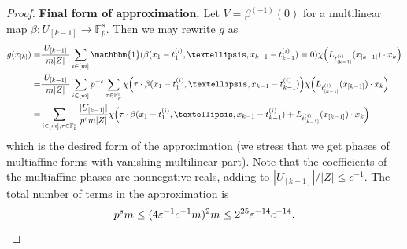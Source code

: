 \documentclass[10pt,a4paper]{amsart}
\newcommand\id{\mathbbm{1}}
\begin{document}
\begin{proof}
    \noindent\textbf{Final form of approximation.} Let $V = \beta^{(-1)}(0)$ for a multilinear map $\beta: U_{[k-1]} \to \mathbb{F}_p^s$. Then we may rewrite $g$ as 
    \begin{align*}g(x_{[k]}) = &\frac{|U_{[k-1]}|}{m |Z|} \sum_{i \in [m]} \id(\beta(x_1 - t^{(i)}_1,\dots,x_{k-1} - t^{(i)}_{k-1}) = 0) \chi\Big(L_{t^{(i)}_{[k-1]}}(x_{[k-1]}) \cdot x_k\Big)\\
    = & \frac{|U_{[k-1]}|}{m |Z|} \sum_{i \in [m]} p^{-s}\sum_{\tau \in \mathbb{F}_p^s} \chi\Big(\tau\cdot \beta(x_1 - t^{(i)}_1,\dots,x_{k-1} - t^{(i)}_{k-1})\Big) \chi\Big(L_{t^{(i)}_{[k-1]}}(x_{[k-1]}) \cdot x_k\Big)\\
    = &  \sum_{i \in [m], \tau \in \mathbb{F}_p^s} \frac{|U_{[k-1]}|}{p^s m |Z|} \chi\Big(\tau\cdot \beta(x_1 - t^{(i)}_1,\dots,x_{k-1} - t^{(i)}_{k-1}) + L_{t^{(i)}_{[k-1]}}(x_{[k-1]}) \cdot x_k\Big)
    \end{align*}
    which is the desired form of the approximation (we stress that we get phases of multiaffine forms with vanishing multilinear part). Note that the coefficients of the multiaffine phases are nonnegative reals, adding to $|U_{[k-1]}| / |Z| \leq c^{-1}$. The total number of terms in the approximation is 
    \[p^s m \leq (4\varepsilon^{-1} c^{-1} m)^2 m \leq 2^{25}\varepsilon^{-14}c^{-14}.\qedhere\]
\end{proof}
\end{document}
